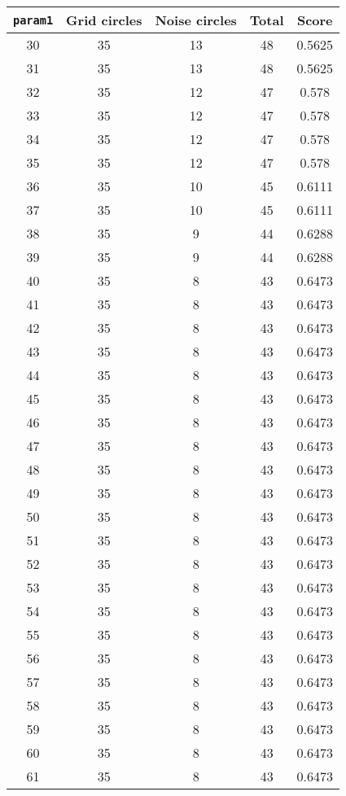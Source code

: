\documentclass[letterpaper, 12pt]{article}
\begin{document}
\begin{longtable}{|c|c|c|c|c|}
\hline
\textbf{\texttt{param1}} & \textbf{Grid circles} & \textbf{Noise circles} & \textbf{Total} & \textbf{Score} \\
\hline
30 & 35 & 13 & 48 & 0.5625 \\
\hline
31 & 35 & 13 & 48 & 0.5625 \\
\hline
32 & 35 & 12 & 47 & 0.578 \\
\hline
33 & 35 & 12 & 47 & 0.578 \\
\hline
34 & 35 & 12 & 47 & 0.578 \\
\hline
35 & 35 & 12 & 47 & 0.578 \\
\hline
36 & 35 & 10 & 45 & 0.6111 \\
\hline
37 & 35 & 10 & 45 & 0.6111 \\
\hline
38 & 35 & 9 & 44 & 0.6288 \\
\hline
39 & 35 & 9 & 44 & 0.6288 \\
\hline
40 & 35 & 8 & 43 & 0.6473 \\
\hline
41 & 35 & 8 & 43 & 0.6473 \\
\hline
42 & 35 & 8 & 43 & 0.6473 \\
\hline
43 & 35 & 8 & 43 & 0.6473 \\
\hline
44 & 35 & 8 & 43 & 0.6473 \\
\hline
45 & 35 & 8 & 43 & 0.6473 \\
\hline
46 & 35 & 8 & 43 & 0.6473 \\
\hline
47 & 35 & 8 & 43 & 0.6473 \\
\hline
48 & 35 & 8 & 43 & 0.6473 \\
\hline
49 & 35 & 8 & 43 & 0.6473 \\
\hline
50 & 35 & 8 & 43 & 0.6473 \\
\hline
51 & 35 & 8 & 43 & 0.6473 \\
\hline
52 & 35 & 8 & 43 & 0.6473 \\
\hline
53 & 35 & 8 & 43 & 0.6473 \\
\hline
54 & 35 & 8 & 43 & 0.6473 \\
\hline
55 & 35 & 8 & 43 & 0.6473 \\
\hline
56 & 35 & 8 & 43 & 0.6473 \\
\hline
57 & 35 & 8 & 43 & 0.6473 \\
\hline
58 & 35 & 8 & 43 & 0.6473 \\
\hline
59 & 35 & 8 & 43 & 0.6473 \\
\hline
60 & 35 & 8 & 43 & 0.6473 \\
\hline
61 & 35 & 8 & 43 & 0.6473 \\

\end{longtable}
\end{document}
